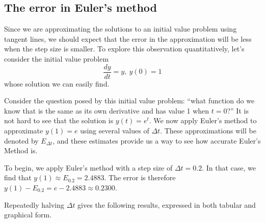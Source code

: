 

\newpage



\subsection*{The error in Euler's method} 

Since we are approximating the solutions to an initial value problem
using tangent lines, we should expect that the error in the
approximation will be less when the step size is smaller.
To explore this observation quantitatively, let's consider the initial value problem
$$
  \frac{dy}{dt} = y, \ y(0) = 1
$$
whose solution we can easily find.

Consider the question posed by this initial value problem: ``what function do we know that is the same as its own
derivative and has value 1 when $t=0$?'' It is not hard to see that the 
solution is $y(t) = e^t$.    We now apply Euler's method
to approximate $y(1) = e$ using several values of $\Delta t$.  These
approximations will be denoted by $E_{\Delta t}$, and these estimates provide us a way to see how accurate Euler's Method is.

To begin, we apply Euler's method with a step size of $\Delta t =
0.2$.  In that case, we find that $y(1) \approx E_{0.2} = 2.4883$.  The
error is therefore $y(1) - E_{0.2} = e - 2.4883 \approx 0.2300$.

Repeatedly halving $\Delta t$ gives the following
results, expressed in both tabular and graphical form.

